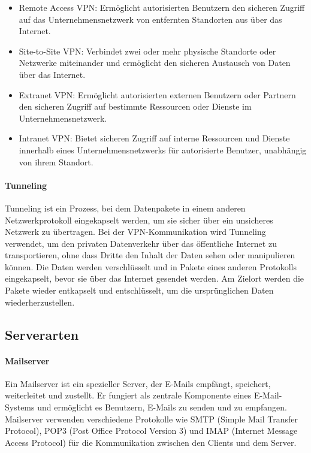\begin{itemize}
	\item Remote Access VPN: Ermöglicht autorisierten Benutzern den sicheren Zugriff auf das Unternehmensnetzwerk von entfernten Standorten aus über das Internet.
	\item Site-to-Site VPN: Verbindet zwei oder mehr physische Standorte oder Netzwerke miteinander und ermöglicht den sicheren Austausch von Daten über das Internet.
	\item Extranet VPN: Ermöglicht autorisierten externen Benutzern oder Partnern den sicheren Zugriff auf bestimmte Ressourcen oder Dienste im Unternehmensnetzwerk.
	\item Intranet VPN: Bietet sicheren Zugriff auf interne Ressourcen und Dienste innerhalb eines Unternehmensnetzwerks für autorisierte Benutzer, unabhängig von ihrem Standort.
\end{itemize}

\paragraph{Tunneling}

Tunneling ist ein Prozess, bei dem Datenpakete in einem anderen Netzwerkprotokoll eingekapselt werden, um sie sicher über ein unsicheres Netzwerk zu übertragen. Bei der VPN-Kommunikation wird Tunneling verwendet, um den privaten Datenverkehr über das öffentliche Internet zu transportieren, ohne dass Dritte den Inhalt der Daten sehen oder manipulieren können. Die Daten werden verschlüsselt und in Pakete eines anderen Protokolls eingekapselt, bevor sie über das Internet gesendet werden. Am Zielort werden die Pakete wieder entkapselt und entschlüsselt, um die ursprünglichen Daten wiederherzustellen.

\subsection{Serverarten}

\paragraph{Mailserver}

Ein Mailserver ist ein spezieller Server, der E-Mails empfängt, speichert, weiterleitet und zustellt. Er fungiert als zentrale Komponente eines E-Mail-Systems und ermöglicht es Benutzern, E-Mails zu senden und zu empfangen. Mailserver verwenden verschiedene Protokolle wie SMTP (Simple Mail Transfer Protocol), POP3 (Post Office Protocol Version 3) und IMAP (Internet Message Access Protocol) für die Kommunikation zwischen den Clients und dem Server.

